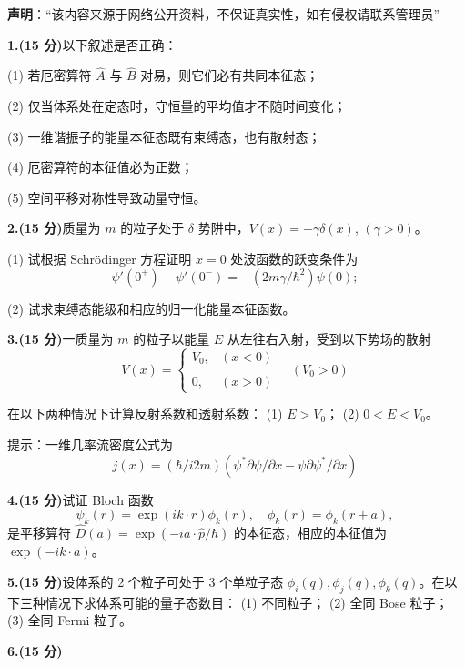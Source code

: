 
\textbf{声明}：“该内容来源于网络公开资料，不保证真实性，如有侵权请联系管理员”

\textbf{1.(15 分)}以下叙述是否正确：

(1) 若厄密算符 $\hat{A}$ 与 $\hat{B}$ 对易，则它们必有共同本征态；

(2) 仅当体系处在定态时，守恒量的平均值才不随时间变化；

(3) 一维谐振子的能量本征态既有束缚态，也有散射态；

(4) 厄密算符的本征值必为正数；

(5) 空间平移对称性导致动量守恒。

\textbf{2.(15 分)}质量为 $m$ 的粒子处于 $\delta$ 势阱中，$V(x) = -\gamma \delta(x)$, $(\gamma > 0)$。

(1) 试根据 Schrödinger 方程证明 $x=0$ 处波函数的跃变条件为
$$\psi'(0^+) - \psi'(0^-) = -\left(2m\gamma/\hbar^2\right)\psi(0);~$$

(2) 试求束缚态能级和相应的归一化能量本征函数。

\textbf{3.(15 分)}一质量为 $m$ 的粒子以能量 $E$ 从左往右入射，受到以下势场的散射
$$V(x) =\begin{cases} V_0, & (x < 0) \\\\0, & (x > 0) \end{cases}\quad (V_0 > 0)~$$

在以下两种情况下计算反射系数和透射系数：
(1) $E > V_0$；
(2) $0 < E < V_0$。

提示：一维几率流密度公式为 
$$j(x) = \left(\hbar/i2m\right)\left(\psi^* \partial \psi/\partial x - \psi \partial \psi^*/\partial x\right)~$$

\textbf{4.(15 分)}试证 Bloch 函数
$$\psi_k(r) = \exp(ik \cdot r)\phi_k(r), \quad \phi_k(r) = \phi_k(r + a),~$$
是平移算符 $\hat{D}(a) = \exp\left(-ia \cdot \hat{p}/\hbar\right)$ 的本征态，相应的本征值为 $\exp\left(-ik \cdot a\right)$。

\textbf{5.(15 分)}设体系的 2 个粒子可处于 3 个单粒子态 $\phi_i(q), \phi_j(q), \phi_k(q)$。在以下三种情况下求体系可能的量子态数目：
(1) 不同粒子；
(2) 全同 Bose 粒子；
(3) 全同 Fermi 粒子。

\textbf{6.(15 分)}